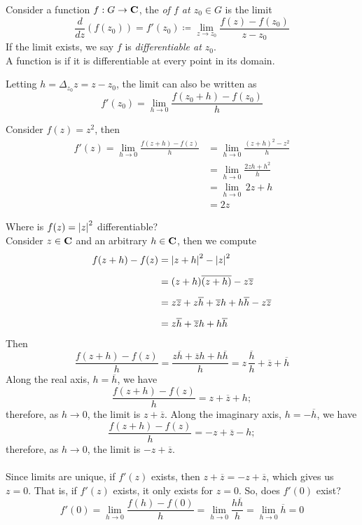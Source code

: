 \begin{definition}[Derivative]\label{cmplxder}
Consider a function $f:G \to \mathbf C$, the  \emph{of $f$ at $z_0 \in G$} is the limit
\[\frac{d}{dz}(f(z_0)) = f'(z_0) \coloneqq \lim_{z \to z_0}\frac{f(z) - f(z_0)}{z - z_0}\]
If the limit exists, we say $f$ is \emph{differentiable at $z_0$}.\\[0.5em]
A function is  if it is differentiable at every point in its domain.
\end{definition}
Letting $h = \Delta_{z_0}z = z - z_0$, the limit can also be written as
\[f'(z_0) = \lim_{h \to 0}\frac{f(z_0 + h) - f(z_0)}{h}\]

\medskip

\begin{example}
Consider $f(z) = z^2$, then
\begin{align*}
f'(z) = \lim_{h \to 0}\frac{f(z + h) - f(z)}{h} &= \lim_{h \to 0}\frac{(z + h)^2 - z^2}{h}\\[0.5em]
&= \lim_{h \to 0}\frac{2zh + h^2}{h}\\[0.5em]
&= \lim_{h \to 0}\,2z + h\\[0.5em]
&= 2z
\end{align*}
\end{example}

\medskip

\begin{example}\label{normdiffexistence}
Where is $f(z) = \left\lvert z\right\rvert^2$ differentiable?\\[1em]
Consider $z \in \mathbf C$ and an arbitrary $h \in \mathbf C$, then we compute
\begin{align*}
f(z + h) - f(z) &= \left\lvert z + h\right\rvert^2 - \left\lvert z\right\rvert^2\\[0.5em]
&= (z + h)\overline{(z + h)} - z\overline{z}\\[0.5em]
&= z\overline{z} + z\overline{h} + \overline{z}h + h\overline{h} - z\overline{z}\\[0.5em]
&= z\overline{h} + \overline{z}h + h\overline{h}
\end{align*}
Then 
\[\frac{f(z + h) - f(z)}{h} = \frac{z\overline{h} + \overline{z}h + h\overline{h}}{h} = z\,\frac{\overline{h}}{h} + \overline{z} + \overline{h}\]
Along the real axis, $h = \overline{h}$, we have
\[\frac{f(z + h) - f(z)}{h} = z + \overline{z} + h;\]
therefore, as $h \to 0$, the limit is $z + \overline{z}$. Along the imaginary axis, $h = -\overline{h}$, we have
\[\frac{f(z + h) - f(z)}{h} = -z + \overline{z} - h;\]
therefore, as $h \to 0$, the limit is $-z + \overline{z}$.\\
\\
Since limits are unique, if $f'(z)$ exists, then $z + \overline{z} = -z + \overline{z}$, which gives us $z = 0$. That is, if $f'(z)$ exists, it only exists for $z = 0$. So, does $f'(0)$ exist?
\[f'(0) = \lim_{h \to 0}\frac{f(h) - f(0)}{h} = \lim_{h \to 0}\frac{h\overline{h}}{h} = \lim_{h \to 0}\overline{h} = 0\]
\end{example}

